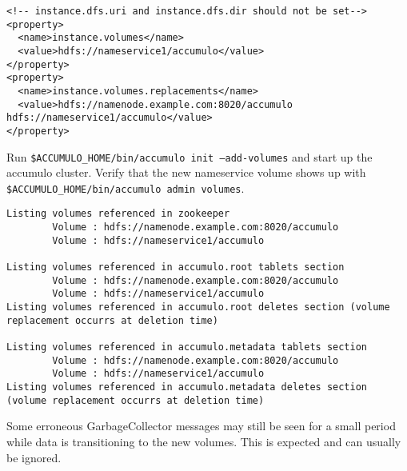 \begingroup\fontsize{8pt}{8pt}\selectfont\begin{verbatim}
<!-- instance.dfs.uri and instance.dfs.dir should not be set-->
<property>
  <name>instance.volumes</name>
  <value>hdfs://nameservice1/accumulo</value>
</property>
<property>
  <name>instance.volumes.replacements</name>
  <value>hdfs://namenode.example.com:8020/accumulo hdfs://nameservice1/accumulo</value>
</property>
\end{verbatim}

Run \texttt{\$ACCUMULO\_HOME/bin/accumulo init --add-volumes} and start up the accumulo cluster. Verify that the
new nameservice volume shows up with \texttt{\$ACCUMULO\_HOME/bin/accumulo admin volumes}.

\begingroup\fontsize{8pt}{8pt}\selectfont\begin{verbatim}
Listing volumes referenced in zookeeper
        Volume : hdfs://namenode.example.com:8020/accumulo
        Volume : hdfs://nameservice1/accumulo

Listing volumes referenced in accumulo.root tablets section
        Volume : hdfs://namenode.example.com:8020/accumulo
        Volume : hdfs://nameservice1/accumulo
Listing volumes referenced in accumulo.root deletes section (volume replacement occurrs at deletion time)

Listing volumes referenced in accumulo.metadata tablets section
        Volume : hdfs://namenode.example.com:8020/accumulo
        Volume : hdfs://nameservice1/accumulo
Listing volumes referenced in accumulo.metadata deletes section (volume replacement occurrs at deletion time)
\end{verbatim}

Some erroneous GarbageCollector messages may still be seen for a small period while data is transitioning to
the new volumes. This is expected and can usually be ignored.


